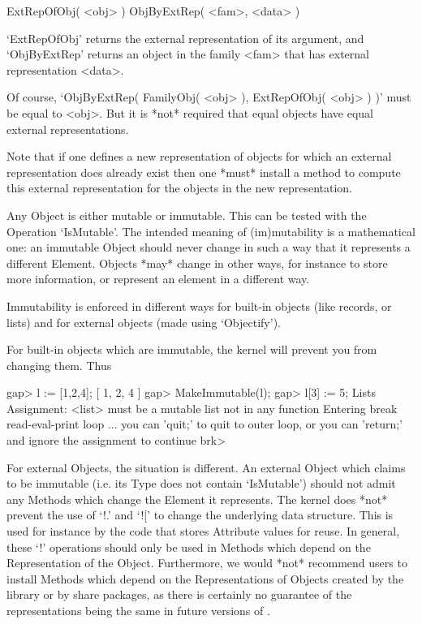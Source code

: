 \>ExtRepOfObj( <obj> )
\>ObjByExtRep( <fam>, <data> )

`ExtRepOfObj' returns the external representation of its argument,
and `ObjByExtRep' returns an object in the family <fam> that has
external representation <data>.

Of course, `ObjByExtRep( FamilyObj( <obj> ), ExtRepOfObj( <obj> ) )'
must be equal to <obj>.
But it is *not* required that equal objects have equal external
representations.

Note that if one defines a new representation of objects for which an
external representation does already exist
then one *must* install a method to compute this external representation
for the objects in the new representation.


Any {\GAP} Object is either mutable or immutable. This can be tested
with the Operation `IsMutable'. The intended meaning of (im)mutability
is a mathematical one:  an immutable Object should never change in
such a way that it represents a different Element. Objects *may*
change in other ways, for instance to store more information, or
represent an element in a different way.

Immutability is enforced in different ways for built-in objects (like
records, or lists) and for external objects (made using `Objectify').

For built-in objects which are immutable, the kernel will prevent
you from changing them. Thus

\beginexample
gap> l := [1,2,4];
[ 1, 2, 4 ]
gap> MakeImmutable(l);
gap> l[3] := 5;
Lists Assignment: <list> must be a mutable list
not in any function
Entering break read-eval-print loop ...
you can 'quit;' to quit to outer loop, or
you can 'return;' and ignore the assignment to continue
brk> 
\endexample

For external Objects, the situation is different. An external Object which
claims to be immutable (i.e. its Type does not contain `IsMutable')
should not admit any Methods which change the Element it represents.
The kernel does *not* prevent the use of `!.' and `![' to change the
underlying data structure.
This is used for instance by the code that stores Attribute values for reuse.
In general, these `!' operations should only be used in Methods
which depend on the Representation of the Object. Furthermore, we would *not*
recommend users to install Methods which depend on the Representations of
Objects created by the library or by share packages, as there is certainly no
guarantee of the representations being the same in future versions of {\GAP}.

